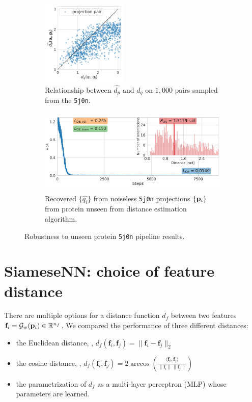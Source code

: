 \begin{figure}[ht!]
    \centering
    \begin{subfigure}[b]{0.35\linewidth}
        \centering
        \includegraphics[height=11em]{figures/dPdQ_5j0n_robustness_to_unseen.pdf}
        \caption{Relationship between $\widehat{d_p}$ and $d_q$ on $1,000$ pairs sampled from the \texttt{5j0n}.}
    \end{subfigure}
    \hfill
    \begin{subfigure}[b]{0.55\linewidth}
        \centering
        \includegraphics[height=11em]{figures/5j0n_ar_aa_robustness_to_unseen.pdf}
        \caption{Recovered $\{ \widehat{q_i} \}$ from noiseless \texttt{5j0n} projections $\{ \mathbf{p}_i \}$ from protein unseen from distance estimation algorithm.}
    \end{subfigure}
    \caption{%
        Robustness to unseen protein \texttt{5j0n} pipeline results.
    }\label{fig:robustness-to-unseen-pipeline}
\end{figure}

\section{SiameseNN: choice of feature distance}\label{apx:siamese:feature-distance}


There are multiple options for a distance function $d_f$ between two features $\mathbf{f}_i = \mathcal{G}_w(\mathbf{p}_i) \in \mathbb{R}^{n_f}$. We compared the performance of three different distances:

\begin{itemize}
    \item the Euclidean distance, \ie, $d_f(\mathbf{f}_i, \mathbf{f}_j) = \| \mathbf{f}_i - \mathbf{f}_j \|_2$
    \item the cosine distance, \ie,
$ d_f(\mathbf{f}_i,\mathbf{f}_j) = 2 \arccos \left( \frac{\langle \mathbf{f}_i, \mathbf{f}_j \rangle}{\lVert \mathbf{f}_i \rVert \lVert \mathbf{f}_j \rVert} \right)$
    \item the parametrization of $d_f$ as a multi-layer perceptron (MLP) whose parameters are learned.
\end{itemize}

